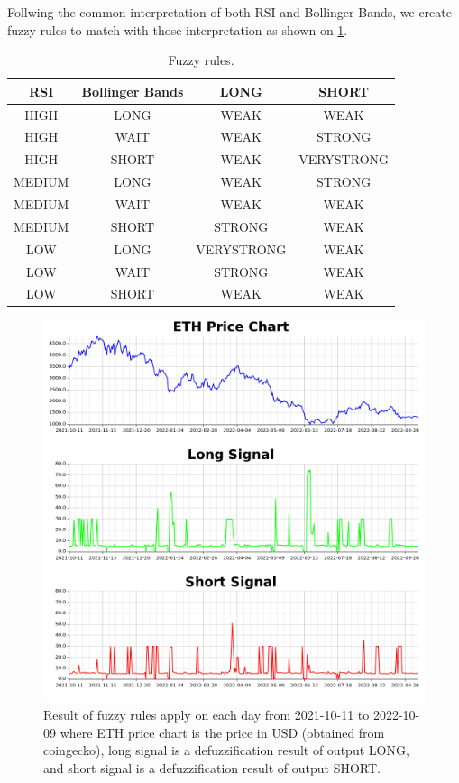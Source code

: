\documentclass{article}
\begin{document}
\FloatBarrier
Follwing the common interpretation of both RSI and Bollinger Bands, we create fuzzy rules to match with those interpretation 
as shown on \cref{table:3}.

\begin{table}[htp]
	\centering
	\begin{tabular}{c c c c}
		\toprule
        {RSI} & {Bollinger Bands} & {LONG} & {SHORT} \\ 
        \midrule
        HIGH & LONG & WEAK & WEAK \\
        HIGH & WAIT & WEAK & STRONG \\
        HIGH & SHORT & WEAK & VERYSTRONG \\
        MEDIUM & LONG & WEAK & STRONG \\
        MEDIUM & WAIT & WEAK & WEAK \\
        MEDIUM & SHORT & STRONG & WEAK \\
        LOW & LONG & VERYSTRONG & WEAK \\
        LOW & WAIT & STRONG & WEAK \\
        LOW & SHORT & WEAK & WEAK \\
        \bottomrule
    \end{tabular} 
    \caption{Fuzzy rules.}
	\label{table:3}
\end{table}
\FloatBarrier

\begin{figure}[ht]
    \centering
    \includegraphics[scale=0.45]{chart.png}
    \caption{Result of fuzzy rules apply on each day from 2021-10-11 to 2022-10-09 where ETH price chart 
    is the price in USD (obtained from coingecko), long signal is a defuzzification result of output LONG, and short signal is a 
    defuzzification result of output SHORT.}
    \label{fig:2}
\end{figure}
\FloatBarrier
\end{document}
